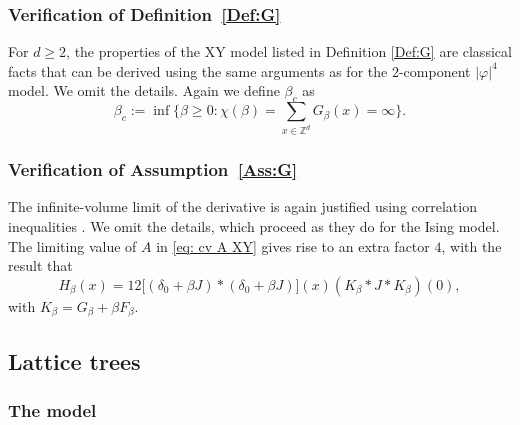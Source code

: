 \documentclass[11pt,a4paper]{article}
\numberwithin{equation}{section}
\theoremstyle{plain}
\theoremstyle{definition}
\newcommand\1{\mathds{1}}
\begin{document}
\subsubsection{Verification of Definition~\ref{Def:G}}

For $d\geq 2$, the properties of the XY model listed in Definition \ref{Def:G} are classical facts that can be
derived using the  same arguments as for the $2$-component $|\varphi|^4$ model.
We omit the details. Again we define $\beta_c$ as
\begin{equation}
\beta_c:=\inf\Big\{\beta \geq 0: \chi(\beta)=\sum_{x\in \mathbb Z^d}G_\beta(x)=\infty\Big\}.
\end{equation}




\subsubsection{Verification of Assumption~\ref{Ass:G}}

The infinite-volume limit of the derivative is again justified
using correlation inequalities \cite{Lebo72,BFS82}.
We omit the details, which proceed as they do for the Ising model.  The limiting
value of $A$ in \eqref{eq: cv A XY} gives rise to an extra factor $4$, with the result
that
\begin{equation}
\label{eq:HXY}
	H_\beta(x)=12 \big[ (\delta_0+\beta J)*(\delta_0+\beta J) \big] (x) (K_\beta*J*K_\beta)(0),
\end{equation}
with $K_\beta=G_\beta+\beta F_\beta$.

\subsection{Lattice trees}
\label{sec:LT}


\subsubsection{The model}
\label{sec:LTmodel}
\end{document}
